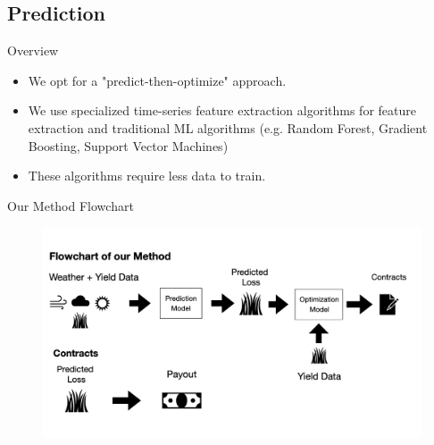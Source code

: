\documentclass{beamer}
\begin{document}
\subsection{Prediction}
\begin{frame}{Overview}
    \begin{itemize}
        \setlength\itemsep{2em}
        \item We opt for a "predict-then-optimize" approach.
        \item We use specialized time-series feature extraction algorithms for feature extraction and traditional ML algorithms (e.g. Random Forest, Gradient Boosting, Support Vector Machines)
        \item These algorithms require less data to train.
    \end{itemize}
\end{frame}

\begin{frame}{Our Method Flowchart}
    \begin{figure}
        \includegraphics[width=\textwidth]{../../../output/figures/Our Method Flowchart.png}
    \end{figure}
\end{frame}
\end{document}

